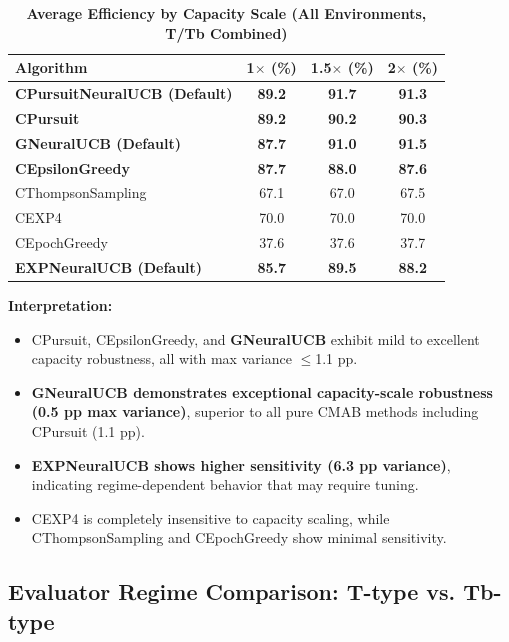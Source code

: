 \documentclass[12pt,a4paper]{article}
\newcommand{\performance}[1]{\textcolor{performancecolor}{\textbf{#1}}}
\newcommand{\legacy}[1]{\textcolor{legacycolor}{\textbf{#1}}}
\newcommand{\neural}[1]{\textcolor{neuralcolor}{\textbf{#1}}}
\begin{document}
\begin{table}[H]
\centering
\caption{\performance{Average Efficiency by Capacity Scale (All Environments, T/Tb Combined)}}
\begin{tabular}{|l|c|c|c|}
\hline
\textbf{Algorithm} & \textbf{1$\times$ (\%)} & \textbf{1.5$\times$ (\%)} & \textbf{2$\times$ (\%)} \\
\hline
\hline
\neural{CPursuitNeuralUCB (Default)}   & \neural{89.2}     & \neural{91.7}     & \neural{91.3} \\
\performance{CPursuit}                 & \performance{89.2} & \performance{90.2} & \performance{90.3} \\
\neural{GNeuralUCB (Default)}          & \neural{87.7}     & \neural{91.0}     & \neural{91.5} \\
\performance{CEpsilonGreedy}           & \performance{87.7} & \performance{88.0} & \performance{87.6} \\
CThompsonSampling                      & 67.1              & 67.0              & 67.5 \\
CEXP4                                  & 70.0              & 70.0              & 70.0 \\
CEpochGreedy                           & 37.6              & 37.6              & 37.7 \\
\legacy{EXPNeuralUCB (Default)}        & \legacy{85.7}     & \legacy{89.5}     & \legacy{88.2} \\
\hline
\end{tabular}
\end{table}

\textbf{Interpretation:}
\begin{itemize}
\item CPursuit, CEpsilonGreedy, and \neural{GNeuralUCB} exhibit mild to excellent capacity robustness, all with max variance $\leq$1.1 pp.
\item \neural{GNeuralUCB demonstrates exceptional capacity-scale robustness (0.5 pp max variance)}, superior to all pure CMAB methods including CPursuit (1.1 pp).
\item \legacy{EXPNeuralUCB shows higher sensitivity (6.3 pp variance)}, indicating regime-dependent behavior that may require tuning.
\item CEXP4 is completely insensitive to capacity scaling, while CThompsonSampling and CEpochGreedy show minimal sensitivity.
\end{itemize}

\subsection{Evaluator Regime Comparison: T-type vs. Tb-type}
\end{document}
